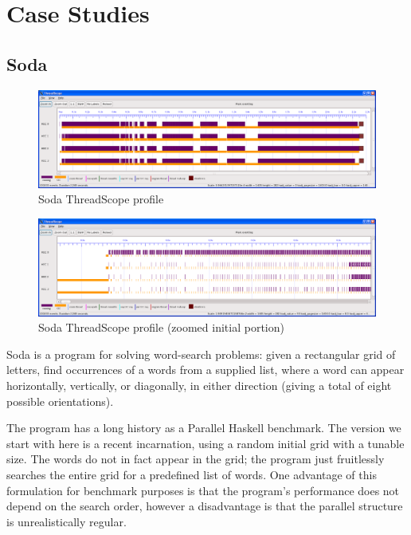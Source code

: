 \documentclass[twocolumn,9pt]{sigplanconf}
\begin{document}


\section{Case Studies}



\subsection{Soda}

\begin{figure}
\begin{center}
\includegraphics[scale=0.3]{soda1.png}
\end{center}
\caption{Soda ThreadScope profile}
\label{f:soda-threadscope}
\end{figure}

\begin{figure}
\begin{center}
\includegraphics[scale=0.3]{soda2.png}
\end{center}
\caption{Soda ThreadScope profile (zoomed initial portion)}
\label{f:soda-threadscope2}
\end{figure}

Soda is a program for solving word-search problems: given a
rectangular grid of letters, find occurrences of a words from a
supplied list, where a word can appear horizontally, vertically, or
diagonally, in either direction (giving a total of eight possible
orientations).

The program has a long history as a Parallel Haskell benchmark.
The version we start with here is a recent incarnation,
using a random initial grid with a tunable size.  The words do not in
fact appear in the grid; the program just fruitlessly searches the
entire grid for a predefined list of words.  One advantage of this
formulation for benchmark purposes is that the program's performance
does not depend on the search order, however a disadvantage is that
the parallel structure is unrealistically regular.
\end{document}
